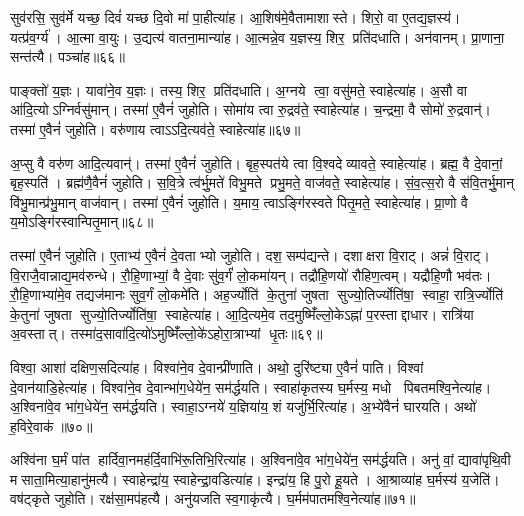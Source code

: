 सुव॑रसि॒ सुव॑र्मे यच्छ॒ दिवं॑ यच्छ दि॒वो मा॑ पा॒हीत्या॑ह। आ॒शिष॑मे॒वैतामाशास्ते। शिरो॒ वा ए॒तद्य॒ज्ञस्य॑। यत्प्र॑व॒र्ग्य॑। आ॒त्मा वा॒युः। उ॒द्यत्य॑ वातना॒मान्या॑ह। आ॒त्मन्ने॒व य॒ज्ञस्य॒ शिर॒ प्रति॑दधाति। अन॑वानम्। प्रा॒णाना॒ सन्त॑त्यै। पञ्चा॑ह॥६६॥

पाङ्क्तो॑ य॒ज्ञः। यावा॑ने॒व य॒ज्ञः। तस्य॒ शिर॒ प्रति॑दधाति। अ॒ग्नये त्वा॒ वसु॑मते॒ स्वाहेत्या॑ह। अ॒सौ वा आ॑दि॒त्योऽग्निर्वसु॑मान्। तस्मा॑ ए॒वैनं॑ जुहोति। सोमा॑य त्वा रु॒द्रव॑ते॒ स्वाहेत्या॑ह। च॒न्द्रमा॒ वै सोमो॑ रु॒द्रवान्॑। तस्मा॑ ए॒वैनं॑ जुहोति। वरु॑णाय त्वाऽऽदि॒त्यव॑ते॒ स्वाहेत्या॑ह॥६७॥

अ॒प्सु वै वरु॑ण आदि॒त्यवान्॑। तस्मा॑ ए॒वैनं॑ जुहोति। बृह॒स्पत॑ये त्वा वि॒श्वदेव्यावते॒ स्वाहेत्या॑ह। ब्रह्म॒ वै दे॒वानां॒ बृह॒स्पति॑। ब्रह्म॑णै॒वैनं॑ जुहोति। स॒वि॒त्रे त्व॑र्भु॒मते॑ विभु॒मते प्रभु॒मते॒ वाज॑वते॒ स्वाहेत्या॑ह। सं॒व॒त्स॒रो वै स॑वि॒तर्भु॒मान् वि॑भु॒मान्प्र॑भु॒मान् वाज॑वान्। तस्मा॑ ए॒वैनं॑ जुहोति। य॒माय॒ त्वाऽङ्गि॑रस्वते पितृ॒मते॒ स्वाहेत्या॑ह। प्रा॒णो वै य॒मोऽङ्गि॑रस्वान्पितृ॒मान्॥६८॥

तस्मा॑ ए॒वैनं॑ जुहोति। ए॒ताभ्य॑ ए॒वैनं॑ दे॒वताभ्यो जुहोति। दश॒ सम्प॑द्यन्ते। दशाक्षरा वि॒राट्। अन्नं॑  वि॒राट्। वि॒राजै॒वान्नाद्य॒मव॑रुन्धे। रौ॒हि॒णाभ्यां॒ वै दे॒वाः सु॑व॒र्गं॑ लो॒कमा॑यन्। तद्रौ॑हि॒णयो॑ रौहिण॒त्वम्। यद्रौ॑हि॒णौ भव॑तः। रौ॒हि॒णाभ्या॑मे॒व तद्यज॑मानः सुव॒र्गं लो॒कमे॑ति। अह॒र्ज्योति॑ के॒तुना॑ जुषता सुज्यो॒तिर्ज्योति॑षा॒ स्वाहा॒ रात्रि॒र्ज्योति॑ के॒तुना॑ जुषता सुज्यो॒तिर्ज्योति॑षा॒ स्वाहेत्या॑ह। आ॒दि॒त्यमे॒व तद॒मुष्मिँ॑ल्लो॒केऽह्ना॑ प॒रस्ताद्दाधार। रात्रि॑या अ॒वस्तात्। तस्मा॑द॒सावा॑दि॒त्यो॑ऽमुष्मिँ॑ल्लो॒के॑ऽहोरा॒त्राभ्यां धृ॒तः॥६९॥
\anuvakamend[म॒नु॒ष्य॒ना॒मानि॑ प॒शव॑ सीद॒त्वित्या॒हेन्द्रा॒येत्या॑हार्द्धयति घ्नन्ति गृह्णा॒त्यहिसायै॒ पञ्चा॑ऽहादि॒त्यव॑ते॒ स्वाहेत्या॑ह पितृ॒माने॑ति च॒त्वारि॑ च]

विश्वा॒ आशा॑ दक्षिण॒सदित्या॑ह। विश्वा॑ने॒व दे॒वान्प्री॑णाति। अथो॒ दुरि॑ष्ट्या ए॒वैनं॑ पाति। विश्वां दे॒वान॑याडि॒हेत्या॑ह। विश्वा॑ने॒व दे॒वान्भा॑ग॒धेये॑न॒ सम॑र्द्धयति। स्वाहा॑कृतस्य घ॒र्मस्य॒ मधो पिबतमश्वि॒नेत्या॑ह। अ॒श्विना॑वे॒व भा॑ग॒धेये॑न॒ सम॑र्द्धयति। स्वाहा॒ऽग्नये॑ य॒ज्ञिया॑य॒ शं यजु॑र्भि॒रित्या॑ह। अ॒भ्ये॑वैनं॑ घारयति। अथो॑ ह॒विरे॒वाक॑॥७०॥

अश्वि॑ना घ॒र्मं पा॑त हार्दिवा॒नमह॑र्दि॒वाभि॑रू॒तिभि॒रित्या॑ह। अ॒श्विना॑वे॒व भा॑ग॒धेये॑न॒ सम॑र्द्धयति। अनु॑ वां॒ द्यावा॑पृथि॒वी मसाता॒मित्या॒हानु॑मत्यै। स्वाहेन्द्रा॑य॒ स्वाहेन्द्रा॒वडित्या॑ह। इन्द्रा॑य॒ हि पु॒रो हू॒यते। आ॒श्राव्या॑ह घ॒र्मस्य॑ य॒जेति॑। वष॑ट्कृते जुहोति। रक्ष॑सा॒मप॑हत्यै। अनु॑यजति स्व॒गाकृ॑त्यै। घ॒र्मम॑पातमश्वि॒नेत्या॑ह॥७१॥

